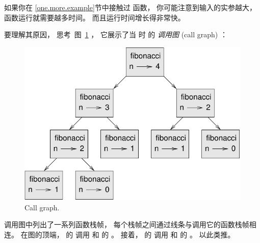 
如果你在 \ref{one.more.example}节中接触过  函数，  你可能注意到输入的实参越大， 函数运行就需要越多时间。
而且运行时间增长得非常快。

  


要理解其原因， 思考 图~\ref{fig.fibonacci} ， 它展示了当  时  的 {\em 调用图} (call graph) ：

\begin{figure}
\centerline
{\includegraphics[scale=0.7]{../source/figs/fibonacci.pdf}}
\caption{Call graph.}
\label{fig.fibonacci}
\end{figure}


调用图中列出了一系列函数栈帧， 每个栈帧之间通过线条与调用它的函数栈帧相连。
在图的顶端，  的  调用  和  的  。   接着，   的  调用  和  的 。   以此类推。

